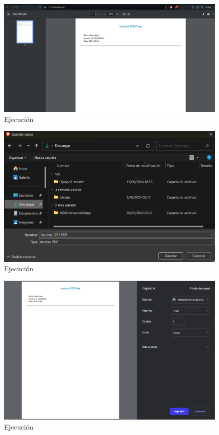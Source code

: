 \documentclass{article}
\begin{document}
\begin{itemize}
        \begin{figure}[H]
          \centering
          \includegraphics[width=1\textwidth, keepaspectratio]{img/ejecucion1.png}
          \caption{Ejecución}
        \end{figure}
        \begin{figure}[H]
          \centering
          \includegraphics[width=1\textwidth, keepaspectratio]{img/ejecucion2.png}
          \caption{Ejecución}
        \end{figure}
        \begin{figure}[H]
          \centering
          \includegraphics[width=1\textwidth, keepaspectratio]{img/ejecucion3.png}
          \caption{Ejecución}
        \end{figure}
    \end{itemize}
  
\end{document}

